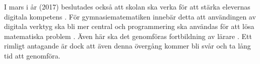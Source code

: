 \textcolor{lila}{I mars i år (2017) beslutades också att skolan ska verka för att stärka elevernas digitala kompetens \cite{regeringen}. För gymnasiematematiken innebär detta att användingen av digitala verktyg ska bli mer central och programmering ska användas för att lösa matematiska problem \cite{itiskolan}. Även här ska det genomföras fortbildning av lärare \cite{prog_utbildning}. Ett rimligt antagande är dock att även denna övergång kommer bli svår och ta lång tid att genomföra.}
            
